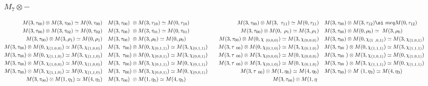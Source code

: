 \subsubsection{$M_7\otimes -$}
\begin{align*}
M(3,\tau_{00}) \otimes M(3,\tau_{00}) \simeq M(0,\tau_{00}) &&& M(3,\tau_{00})\
 \otimes M(3,\tau_{10}) \simeq M(0,\tau_{10}) &&& M(3,\tau_{00}) \otimes M(3,\
\tau_{11}) \simeq M(0,\tau_{11}) &&& M(3,\tau_{00}) \otimes M(3,\tau_{12}) \si\
meq M(0,\tau_{12})\\
M(3,\tau_{00}) \otimes M(3,\tau_{02}) \simeq M(0,\tau_{02}) &&& M(3,\tau_{00})\
 \otimes M(3,\tau_{01}) \simeq M(0,\tau_{01}) &&& M(3,\tau_{00}) \otimes M(0,\
\rho_{1}) \simeq M(3,\rho_{1}) &&& M(3,\tau_{00}) \otimes M(0,\rho_{0}) \simeq\
 M(3,\rho_{0})\\
M(3,\tau_{00}) \otimes M(3,\rho_{1}) \simeq M(0,\rho_{1}) &&& M(3,\tau_{00}) \
\otimes M(3,\rho_{0}) \simeq M(0,\rho_{0}) &&& M(3,\tau_{00}) \otimes M(0,\chi\
_{(0,0,0)}) \simeq M(3,\chi_{(0,0,0)}) &&& M(3,\tau_{00}) \otimes M(0,\chi_{(1\
,0,1)}) \simeq M(3,\chi_{(1,0,1)})\\
M(3,\tau_{00}) \otimes M(0,\chi_{(1,0,0)}) \simeq M(3,\chi_{(1,0,0)}) &&& M(3,\
\tau_{00}) \otimes M(0,\chi_{(0,1,1)}) \simeq M(3,\chi_{(0,1,1)}) &&& M(3,\tau\
_{00}) \otimes M(0,\chi_{(0,1,0)}) \simeq M(3,\chi_{(0,1,0)}) &&& M(3,\tau_{00\
}) \otimes M(0,\chi_{(1,1,1)}) \simeq M(3,\chi_{(1,1,1)})\\
M(3,\tau_{00}) \otimes M(0,\chi_{(1,1,0)}) \simeq M(3,\chi_{(1,1,0)}) &&& M(3,\
\tau_{00}) \otimes M(0,\chi_{(0,0,1)}) \simeq M(3,\chi_{(0,0,1)}) &&& M(3,\tau\
_{00}) \otimes M(3,\chi_{(0,0,0)}) \simeq M(0,\chi_{(0,0,0)}) &&& M(3,\tau_{00\
}) \otimes M(3,\chi_{(1,0,1)}) \simeq M(0,\chi_{(1,0,1)})\\
M(3,\tau_{00}) \otimes M(3,\chi_{(1,0,0)}) \simeq M(0,\chi_{(1,0,0)}) &&& M(3,\
\tau_{00}) \otimes M(3,\chi_{(0,1,1)}) \simeq M(0,\chi_{(0,1,1)}) &&& M(3,\tau\
_{00}) \otimes M(3,\chi_{(0,1,0)}) \simeq M(0,\chi_{(0,1,0)}) &&& M(3,\tau_{00\
}) \otimes M(3,\chi_{(1,1,1)}) \simeq M(0,\chi_{(1,1,1)})\\
M(3,\tau_{00}) \otimes M(3,\chi_{(1,1,0)}) \simeq M(0,\chi_{(1,1,0)}) &&& M(3,\
\tau_{00}) \otimes M(3,\chi_{(0,0,1)}) \simeq M(0,\chi_{(0,0,1)}) &&& M(3,\tau\
_{00}) \otimes M(1,\eta_{0}) \simeq M(4,\eta_{0}) &&& M(3,\tau_{00}) \otimes M\
(1,\eta_{3}) \simeq M(4,\eta_{3})\\
M(3,\tau_{00}) \otimes M(1,\eta_{1}) \simeq M(4,\eta_{1}) &&& M(3,\tau_{00}) \
\otimes M(1,\eta_{5}) \simeq M(4,\eta_{5}) &&& M(3,\tau_{00}) \otimes M(1,\eta\

\end{align*}
